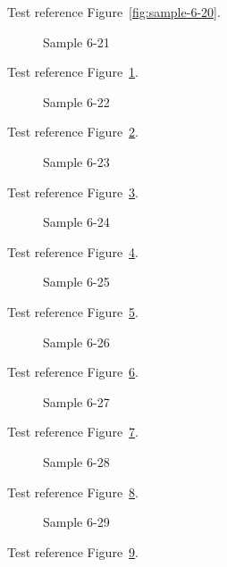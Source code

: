 Test reference Figure~\ref{fig:sample-6-20}.

\begin{figure}[tbhp]
\caption{Sample 6-21}
\label{fig:sample-6-21}
\end{figure}

Test reference Figure~\ref{fig:sample-6-21}.

\begin{figure}[tbhp]
\caption{Sample 6-22}
\label{fig:sample-6-22}
\end{figure}

Test reference Figure~\ref{fig:sample-6-22}.

\begin{figure}[tbhp]
\caption{Sample 6-23}
\label{fig:sample-6-23}
\end{figure}

Test reference Figure~\ref{fig:sample-6-23}.

\begin{figure}[tbhp]
\caption{Sample 6-24}
\label{fig:sample-6-24}
\end{figure}

Test reference Figure~\ref{fig:sample-6-24}.

\begin{figure}[tbhp]
\caption{Sample 6-25}
\label{fig:sample-6-25}
\end{figure}

Test reference Figure~\ref{fig:sample-6-25}.

\begin{figure}[tbhp]
\caption{Sample 6-26}
\label{fig:sample-6-26}
\end{figure}

Test reference Figure~\ref{fig:sample-6-26}.

\begin{figure}[tbhp]
\caption{Sample 6-27}
\label{fig:sample-6-27}
\end{figure}

Test reference Figure~\ref{fig:sample-6-27}.

\begin{figure}[tbhp]
\caption{Sample 6-28}
\label{fig:sample-6-28}
\end{figure}

Test reference Figure~\ref{fig:sample-6-28}.

\begin{figure}[tbhp]
\caption{Sample 6-29}
\label{fig:sample-6-29}
\end{figure}

Test reference Figure~\ref{fig:sample-6-29}.

